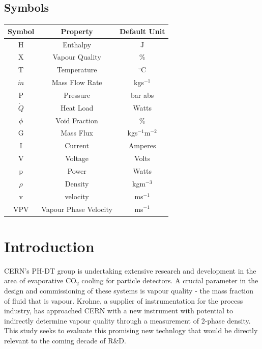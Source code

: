 \documentclass{report}
\begin{document}
\section*{Symbols}
\begin{center}
\begin{tabular}{|c|c|c|}
\hline
\textbf{Symbol} & \textbf{Property} & \textbf{Default Unit} \\\hline
H & Enthalpy & J \\\hline
X & Vapour Quality & \% \\\hline
T & Temperature & $^\circ$C\\\hline
$\dot{m}$ & Mass Flow Rate & kgs$^{-1}$ \\\hline
P & Pressure & bar abs \\\hline
$\dot{Q}$ & Heat Load & Watts \\\hline
$\phi$ & Void Fraction & \% \\\hline
G & Mass Flux & kgs$^{-1}$m$^{-2}$\\\hline
I & Current & Amperes \\\hline
V & Voltage & Volts \\\hline
p & Power & Watts \\\hline
$\rho$ & Density & kgm$^{-3}$\\\hline
v & velocity &  ms$^{-1}$\\\hline
VPV & Vapour Phase Velocity & ms$^{-1}$
\end{tabular}
\end{center}
\tableofcontents
\chapter{Introduction}
\doublespacing
CERN's PH-DT group is undertaking extensive research and development in the area of evaporative CO$_2$ cooling for particle detectors. A crucial parameter in the design and commissioning of these systems is vapour quality - the mass fraction of fluid that is vapour. Krohne, a supplier of instrumentation for the process industry, has approached CERN with a new instrument with potential to indirectly determine vapour quality through a measurement of 2-phase density. This study seeks to evaluate this promising new technlogy that would be directly relevant to the coming decade of R\&\ignorespaces D. 
\end{document}
